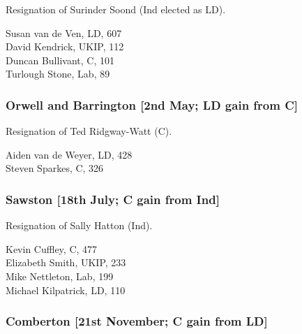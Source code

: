 \documentclass[a4paper,openany,10pt]{book}
\begin{document}
Resignation of Surinder Soond (Ind elected as LD).



Susan van de Ven, LD, 607\\
David Kendrick, UKIP, 112\\
Duncan Bullivant, C, 101\\
Turlough Stone, Lab, 89\\


\subsubsection*{Orwell and Barrington \hspace*{\fill}\nolinebreak[1]%
\enspace\hspace*{\fill}
[2nd May; LD gain from C]}


Resignation of Ted Ridgway-Watt (C).



Aiden van de Weyer, LD, 428\\
Steven Sparkes, C, 326\\


\subsubsection*{Sawston \hspace*{\fill}\nolinebreak[1]%
\enspace\hspace*{\fill}
[18th July; C gain from Ind]}


Resignation of Sally Hatton (Ind).



Kevin Cuffley, C, 477\\
Elizabeth Smith, UKIP, 233\\
Mike Nettleton, Lab, 199\\
Michael Kilpatrick, LD, 110\\


\subsubsection*{Comberton \hspace*{\fill}\nolinebreak[1]%
\enspace\hspace*{\fill}
[21st November; C gain from LD]}
\end{document}
